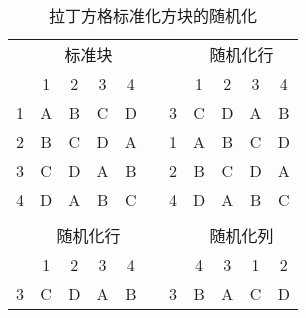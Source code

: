 \begin{table}[h]
  \caption{拉丁方格标准化方块的随机化}
    \begin{tabular}{ccccccccccc}
          & \multicolumn{4}{c}{标准块}       &       &       & \multicolumn{4}{c}{随机化行} \\
          & 1     & 2     & 3     & 4     &       &       & 1     & 2     & 3     & 4 \\
    1     & \cellcolor[rgb]{ .851,  .882,  .949}A & \cellcolor[rgb]{ .851,  .882,  .949}B & \cellcolor[rgb]{ .851,  .882,  .949}C & \cellcolor[rgb]{ .851,  .882,  .949}D &       & 3     & \cellcolor[rgb]{ .886,  .937,  .855}C & \cellcolor[rgb]{ .886,  .937,  .855}D & \cellcolor[rgb]{ .886,  .937,  .855}A & \cellcolor[rgb]{ .886,  .937,  .855}B \\
    2     & \cellcolor[rgb]{ 1,  .949,  .8}B & \cellcolor[rgb]{ 1,  .949,  .8}C & \cellcolor[rgb]{ 1,  .949,  .8}D & \cellcolor[rgb]{ 1,  .949,  .8}A &       & 1     & \cellcolor[rgb]{ .851,  .882,  .949}A & \cellcolor[rgb]{ .851,  .882,  .949}B & \cellcolor[rgb]{ .851,  .882,  .949}C & \cellcolor[rgb]{ .851,  .882,  .949}D \\
    3     & \cellcolor[rgb]{ .886,  .937,  .855}C & \cellcolor[rgb]{ .886,  .937,  .855}D & \cellcolor[rgb]{ .886,  .937,  .855}A & \cellcolor[rgb]{ .886,  .937,  .855}B &       & 2     & \cellcolor[rgb]{ 1,  .949,  .8}B & \cellcolor[rgb]{ 1,  .949,  .8}C & \cellcolor[rgb]{ 1,  .949,  .8}D & \cellcolor[rgb]{ 1,  .949,  .8}A \\
    4     & \cellcolor[rgb]{ .929,  .929,  .929}D & \cellcolor[rgb]{ .929,  .929,  .929}A & \cellcolor[rgb]{ .929,  .929,  .929}B & \cellcolor[rgb]{ .929,  .929,  .929}C &       & 4     & \cellcolor[rgb]{ .929,  .929,  .929}D & \cellcolor[rgb]{ .929,  .929,  .929}A & \cellcolor[rgb]{ .929,  .929,  .929}B & \cellcolor[rgb]{ .929,  .929,  .929}C \\
          &       &       &       &       &       &       &       &       &       &  \\
          & \multicolumn{4}{c}{随机化行}      &       &       & \multicolumn{4}{c}{随机化列} \\
          & 1     & 2     & 3     & 4     &       &       & 4     & 3     & 1     & 2 \\
    3     & \cellcolor[rgb]{ .851,  .882,  .949}C & \cellcolor[rgb]{ .988,  .894,  .839}D & \cellcolor[rgb]{ .929,  .929,  .929}A & \cellcolor[rgb]{ .886,  .937,  .855}B &       & 3     & \cellcolor[rgb]{ .886,  .937,  .855}B & \cellcolor[rgb]{ .929,  .929,  .929}A & \cellcolor[rgb]{ .851,  .882,  .949}C & \cellcolor[rgb]{ .988,  .894,  .839}D \\

\end{tabular}
\end{table}
